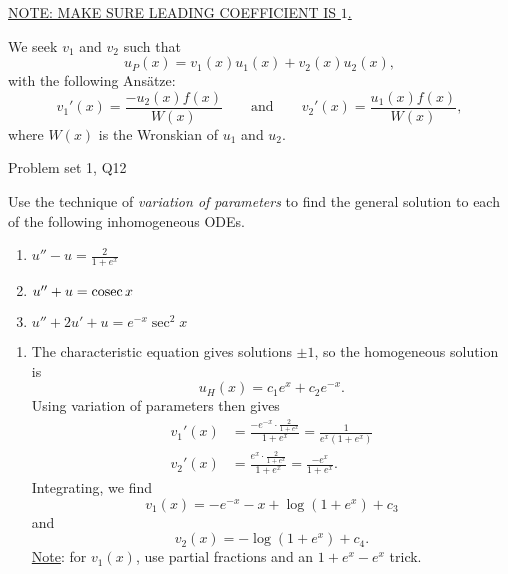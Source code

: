 \begin{center}
    \underline{NOTE: MAKE SURE LEADING COEFFICIENT IS $1$.}
\end{center}

We seek $v_1$ and $v_2$ such that
    $$ u_P(x) = v_1(x) u_1(x) + v_2(x) u_2(x) , $$
with the following Ansätze:
    $$ v_1'(x) = \frac{-u_2(x) f(x)}{W(x)}
        \qquad \text{and} \qquad
        v_2'(x) = \frac{u_1(x) f(x)}{W(x)} , $$
where $W(x)$ is the Wronskian of $u_1$ and $u_2$.

\begin{problem}{Problem set 1, Q12}{}


    Use the technique of \textit{variation of parameters} to find the general solution to each of the following inhomogeneous ODEs.

    \begin{enumerate}
        \item $u'' - u = \frac{2}{1 + e^x}$
        \item $u'' + u = \operatorname{cosec} x$
        \item $u'' + 2u' + u = e^{-x} \sec^2 x$
    \end{enumerate}

    \tcblower

    \begin{enumerate}
        \item \marginnote{[Easy.]} The characteristic equation gives solutions $\pm 1$, so the homogeneous solution is
            $$ u_H(x) = c_1 e^x + c_2 e^{-x} . $$
        Using variation of parameters then gives
            \begin{align*}
                v_1'(x) &= \frac{-e^{-x} \cdot
                \frac{2}{1 + e^x}}{1 + e^x}
                    = \frac{1}{e^x (1 + e^x)} \\
                v_2'(x) &= \frac{e^x \cdot
                    \frac{2}{1 + e^x}}{1 + e^x}
                    = \frac{-e^x}{1+e^x} .
            \end{align*}
        Integrating, we find
            $$ v_1(x) = -e^{-x} - x + \log(1 + e^x) + c_3 $$
        and
            $$ v_2(x) = -\log(1 + e^x) + c_4 . $$
        \underline{Note}: for $v_1(x)$, use partial fractions and an $1 + e^x - e^x$ trick.


\end{enumerate}
\end{problem}
